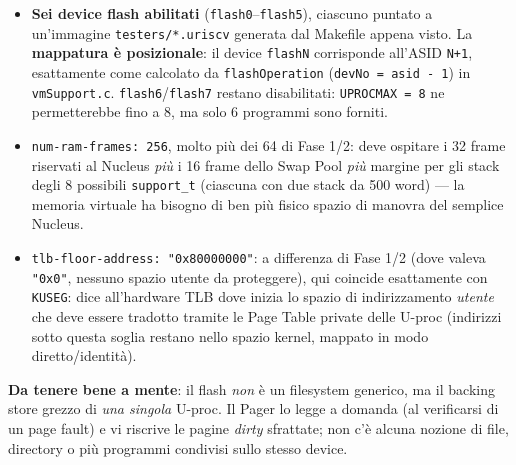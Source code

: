 \documentclass[11pt,a4paper]{article}
\newcommand{\code}[1]{\texttt{#1}}
\begin{document}
\begin{itemize}
\item \textbf{Sei device flash abilitati} (\code{flash0}--\code{flash5}),
  ciascuno puntato a un'immagine \code{testers/*.uriscv} generata dal
  Makefile appena visto. La \textbf{mappatura è posizionale}: il device
  \code{flashN} corrisponde all'ASID \code{N+1}, esattamente come calcolato
  da \code{flashOperation} (\code{devNo = asid - 1}) in
  \code{vmSupport.c}. \code{flash6}/\code{flash7} restano disabilitati:
  \code{UPROCMAX = 8} ne permetterebbe fino a 8, ma solo 6 programmi sono
  forniti.
\item \code{num-ram-frames: 256}, molto più dei 64 di Fase 1/2: deve
  ospitare i 32 frame riservati al Nucleus \emph{più} i 16 frame dello
  Swap Pool \emph{più} margine per gli stack degli 8 possibili
  \code{support\_t} (ciascuna con due stack da 500 word) --- la memoria
  virtuale ha bisogno di ben più fisico spazio di manovra del semplice
  Nucleus.
\item \code{tlb-floor-address: "0x80000000"}: a differenza di Fase 1/2
  (dove valeva \code{"0x0"}, nessuno spazio utente da proteggere), qui
  coincide esattamente con \code{KUSEG}: dice all'hardware TLB dove inizia
  lo spazio di indirizzamento \emph{utente} che deve essere tradotto
  tramite le Page Table private delle U-proc (indirizzi sotto questa soglia
  restano nello spazio kernel, mappato in modo diretto/identità).
\end{itemize}

\textbf{Da tenere bene a mente}: il flash \emph{non} è un filesystem
generico, ma il backing store grezzo di \emph{una singola} U-proc. Il Pager
lo legge a domanda (al verificarsi di un page fault) e vi riscrive le
pagine \emph{dirty} sfrattate; non c'è alcuna nozione di file, directory o
più programmi condivisi sullo stesso device.

\end{document}
